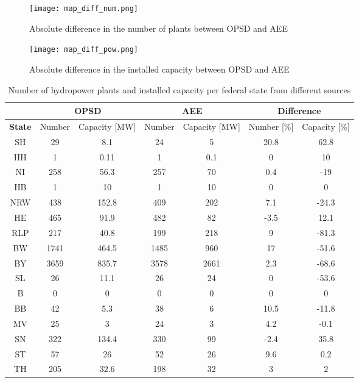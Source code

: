 \begin{figure}[H]
\centering
\texttt{[image: map\_diff\_num.png]}
\caption[Absolute difference in the number of plants between OPSD and AEE]{Absolute difference in the number of plants between OPSD and AEE}
\label{map_diff_num}
\end{figure}


\begin{figure}[H]
\centering
\texttt{[image: map\_diff\_pow.png]}
\caption[Absolute difference in the installed capacity between OPSD and AEE]{Absolute difference in the installed capacity between OPSD and AEE}
\label{map_diff_pow}
\end{figure}

\begin{table}[H]
\footnotesize 
 \centering
 \caption[Number of hydropower plants and installed capacity per federal state from different sources]{Number of hydropower plants and installed capacity per federal state from different sources}
 \label{oedb_aee_diff}
 \begin{tabular}{|c|cc|cc| cc|}
  \cline{2-7}
  \multicolumn{0}{c|}{} &\multicolumn{2}{c}{\textbf{OPSD \cite{oedb}}}&\multicolumn{2}{|c|}{\textbf{AEE \cite{aee}}}&\multicolumn{2}{c|}{\textbf{Difference}} \\
  \hline
  \textbf{State} & Number 	& 	Capacity [\unit{MW}] 	&	Number 	& 	Capacity [\unit{MW}] 	&	Number [\unit{\%}] 	&	Capacity [\unit{\%}] \\
  \hline
  SH	&	29	&	8.1		&	24	&	5		&	20.8		&	62.8	\\
  HH	&	1	&	0.11		&	1	&	0.1		&	0		&	10	\\
  NI	&	258	&	56.3		&	257	&	70		&	0.4		&	-19	\\
  HB	&	1	&	10		&	1	&	10		&	0		&	0	\\
  NRW	&	438	&	152.8		&	409	&	202		&	7.1		&	-24.3	\\
  HE	&	465	&	91.9		&	482	&	82		&	-3.5		&	12.1	\\
  RLP	&	217	&	40.8		&	199	&	218		&	9		&	-81.3	\\
  BW	&	1741	&	464.5		&	1485	&	960		&	17		&	-51.6	\\	
  BY	&	3659	&	835.7		&	3578	&	2661		&	2.3		&	-68.6	\\
  SL	&	26	&	11.1		&	26	&	24		&	0		&	-53.6	\\
  B	&	0	&	0		&	0	&	0		&	0		&	0	\\
  BB	&	42	&	5.3		&	38	&	6		&	10.5		&	-11.8	\\
  MV	&	25	&	3		&	24	&	3		&	4.2		&	-0.1	\\
  SN	&	322	&	134.4		&	330	&	99		&	-2.4		&	35.8	\\
  ST	&	57	&	26		&	52	&	26		&	9.6		&	0.2	\\
  TH	&	205	&	32.6		&	198	&	32		&	3		&	2	\\
  \hline
 \end{tabular} 
\end{table}

